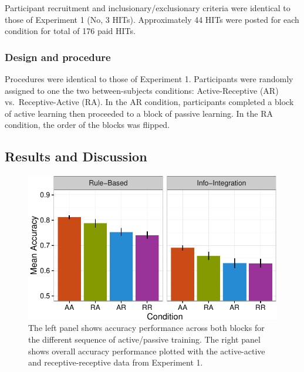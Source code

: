 \documentclass[10pt, letterpaper]{article}
\newenvironment{CodeChunk}{}{}
\begin{document}
Participant recruitment and inclusionary/exclusionary criteria were
identical to those of Experiment 1 (No, 3 HITs). Approximately 44 HITs
were posted for each condition for total of 176 paid HITs.

\subsubsection{Design and procedure}\label{design-and-procedure-2}

Procedures were identical to those of Experiment 1. Participants were
randomly assigned to one the two between-subjects conditions:
Active-Receptive (AR) vs.~Receptive-Active (RA). In the AR condition,
participants completed a block of active learning then proceeded to a
block of passive learning. In the RA condition, the order of the blocks
was flipped.

\subsection{Results and Discussion}\label{results-and-discussion-2}

\begin{CodeChunk}
\captionsetup{width=0.8\textwidth}\begin{figure}[t]

{\centering \includegraphics{figs/exp2_acc_plot-1} 

}

\caption[The left panel shows accuracy performance across both blocks for the different sequence of active/passive training]{The left panel shows accuracy performance across both blocks for the different sequence of active/passive training. The right panel shows overall accuracy performance plotted with the active-active and receptive-receptive data from Experiment 1.}\label{fig:exp2_acc_plot}
\end{figure}
\end{CodeChunk}
\end{document}

